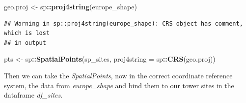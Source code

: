 \documentclass[
]{book}
\newenvironment{Shaded}{\begin{snugshade}}{\end{snugshade}}
\newcommand{\DataTypeTok}[1]{\textcolor[rgb]{0.13,0.29,0.53}{#1}}
\newcommand{\KeywordTok}[1]{\textcolor[rgb]{0.13,0.29,0.53}{\textbf{#1}}}
\newcommand{\NormalTok}[1]{#1}
\newcommand{\OperatorTok}[1]{\textcolor[rgb]{0.81,0.36,0.00}{\textbf{#1}}}
\newcommand{\StringTok}[1]{\textcolor[rgb]{0.31,0.60,0.02}{#1}}
\begin{document}
\begin{Shaded}
\begin{Highlighting}[]
\NormalTok{geo.proj <-}\StringTok{ }\NormalTok{sp}\OperatorTok{::}\KeywordTok{proj4string}\NormalTok{(europe_shape)}
\end{Highlighting}
\end{Shaded}

\begin{verbatim}
## Warning in sp::proj4string(europe_shape): CRS object has comment, which is lost
## in output
\end{verbatim}

\begin{Shaded}
\begin{Highlighting}[]
\NormalTok{pts <-}\StringTok{ }\NormalTok{sp}\OperatorTok{::}\KeywordTok{SpatialPoints}\NormalTok{(sp_sites, }\DataTypeTok{proj4string =}\NormalTok{ sp}\OperatorTok{::}\KeywordTok{CRS}\NormalTok{(geo.proj))}
\end{Highlighting}
\end{Shaded}

Then we can take the \emph{SpatialPoints}, now in the correct coordinate reference system, the data from \emph{europe\_shape} and bind them to our tower sites in the dataframe \emph{df\_sites}.

\begin{Shaded}
\end{Shaded}
\end{document}
